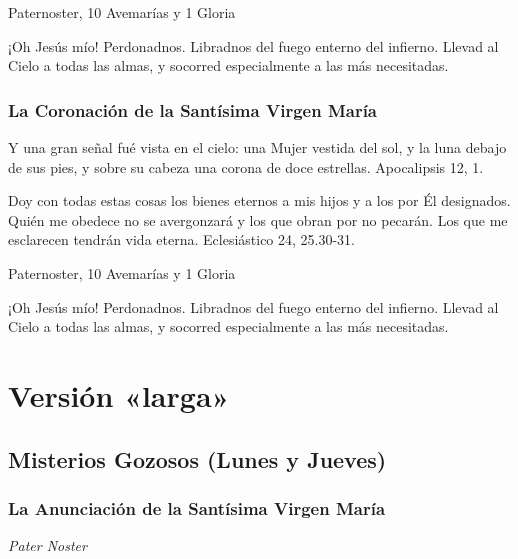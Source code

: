 \documentclass[a4paper,11pt, oneside]{report}
\begin{document}
         Paternoster, 10 Avemarías y 1 Gloria
        
        \medskip
        ¡Oh Jesús mío! Perdonadnos. Libradnos del fuego enterno del infierno. Llevad al Cielo a todas las almas, y socorred especialmente a las más necesitadas.

      \subsection*{La Coronación de la Santísima Virgen María}
        Y una gran señal fué vista en el cielo: una Mujer vestida del sol, y la luna debajo de sus pies, y sobre su cabeza una corona de doce estrellas.
        Apocalipsis 12, 1.

        \medskip
        Doy con todas estas cosas los bienes eternos a mis hijos y a los por Él designados. Quién me obedece no se avergonzará y los que obran por
        no pecarán. Los que me esclarecen tendrán vida eterna. Eclesiástico 24, 25.30-31.

         Paternoster, 10 Avemarías y 1 Gloria
        
        \medskip
        ¡Oh Jesús mío! Perdonadnos. Libradnos del fuego enterno del infierno. Llevad al Cielo a todas las almas, y socorred especialmente a las más necesitadas.

  \chapter*{Versión «larga»}
  
    \section*{Misterios Gozosos (Lunes y Jueves)}

      \subsection*{La Anunciación de la Santísima Virgen María}

        \textit{Pater Noster}
\end{document}

